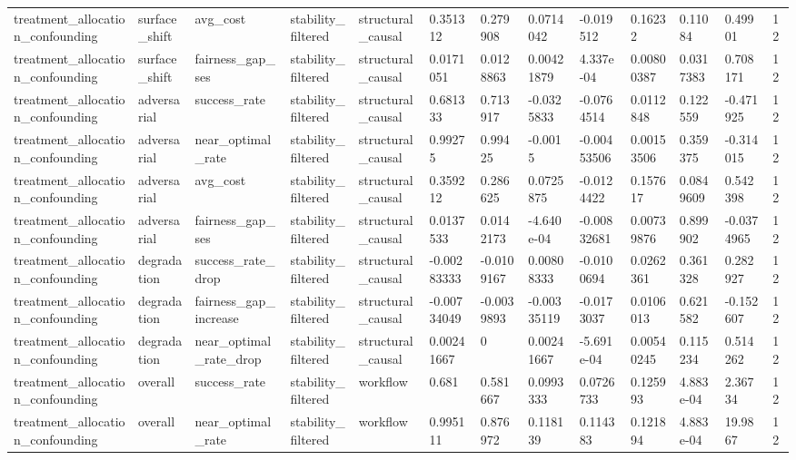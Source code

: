 \begin{tabular}{lllllllllllll}
treatment\_allocation\_confounding & surface\_shift & avg\_cost & stability\_filtered & structural\_causal & 0.351312 & 0.279908 & 0.0714042 & -0.019512 & 0.16232 & 0.11084 & 0.49901 & 12 \\
treatment\_allocation\_confounding & surface\_shift & fairness\_gap\_ses & stability\_filtered & structural\_causal & 0.0171051 & 0.0128863 & 0.00421879 & 4.337e-04 & 0.00800387 & 0.0317383 & 0.708171 & 12 \\
treatment\_allocation\_confounding & adversarial & success\_rate & stability\_filtered & structural\_causal & 0.681333 & 0.713917 & -0.0325833 & -0.0764514 & 0.0112848 & 0.122559 & -0.471925 & 12 \\
treatment\_allocation\_confounding & adversarial & near\_optimal\_rate & stability\_filtered & structural\_causal & 0.99275 & 0.99425 & -0.0015 & -0.00453506 & 0.00153506 & 0.359375 & -0.314015 & 12 \\
treatment\_allocation\_confounding & adversarial & avg\_cost & stability\_filtered & structural\_causal & 0.359212 & 0.286625 & 0.0725875 & -0.0124422 & 0.157617 & 0.0849609 & 0.542398 & 12 \\
treatment\_allocation\_confounding & adversarial & fairness\_gap\_ses & stability\_filtered & structural\_causal & 0.0137533 & 0.0142173 & -4.640e-04 & -0.00832681 & 0.00739876 & 0.899902 & -0.0374965 & 12 \\
treatment\_allocation\_confounding & degradation & success\_rate\_drop & stability\_filtered & structural\_causal & -0.00283333 & -0.0109167 & 0.00808333 & -0.0100694 & 0.0262361 & 0.361328 & 0.282927 & 12 \\
treatment\_allocation\_confounding & degradation & fairness\_gap\_increase & stability\_filtered & structural\_causal & -0.00734049 & -0.0039893 & -0.00335119 & -0.0173037 & 0.0106013 & 0.621582 & -0.152607 & 12 \\
treatment\_allocation\_confounding & degradation & near\_optimal\_rate\_drop & stability\_filtered & structural\_causal & 0.00241667 & 0 & 0.00241667 & -5.691e-04 & 0.00540245 & 0.115234 & 0.514262 & 12 \\
treatment\_allocation\_confounding & overall & success\_rate & stability\_filtered & workflow & 0.681 & 0.581667 & 0.0993333 & 0.0726733 & 0.125993 & 4.883e-04 & 2.36734 & 12 \\
treatment\_allocation\_confounding & overall & near\_optimal\_rate & stability\_filtered & workflow & 0.995111 & 0.876972 & 0.118139 & 0.114383 & 0.121894 & 4.883e-04 & 19.9867 & 12 \\

\end{tabular}
